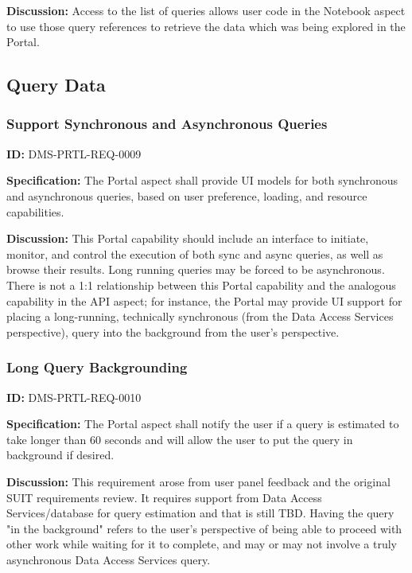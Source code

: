 \documentclass[SE,toc]{lsstdoc}
\begin{document}
\textbf{Discussion:}
Access to the list of queries allows user code in the Notebook aspect to use those query references to retrieve the data which was being explored in the Portal.

\subsection{Query Data}

\subsubsection{Support Synchronous and Asynchronous Queries}

\label{DMS-PRTL-REQ-0009}
\textbf{ID:} DMS-PRTL-REQ-0009

\textbf{Specification:}
The Portal aspect shall provide UI models for both synchronous and asynchronous queries, based on user preference, loading, and resource capabilities.

\textbf{Discussion:}
This Portal capability should include an interface to initiate, monitor, and control the execution of both sync and async queries, as well as browse their results. Long running queries may be forced to be asynchronous.
There is not a 1:1 relationship between this Portal capability and the analogous capability in the API aspect; for instance, the Portal may provide UI support for placing a long-running, technically synchronous (from the Data Access Services perspective), query into the background from the user's perspective.

\subsubsection{Long Query Backgrounding}

\label{DMS-PRTL-REQ-0010}
\textbf{ID:} DMS-PRTL-REQ-0010

\textbf{Specification:}
The Portal aspect shall notify the user if a query is estimated to take longer than 60 seconds and will allow the user to put the query in background if desired.

\textbf{Discussion:}
This requirement arose from user panel feedback and the original SUIT requirements review.  It requires support from Data Access Services/database for query estimation and that is still TBD.  Having the query "in the background" refers to the user's perspective of being able to proceed with other work while waiting for it to complete, and may or may not involve a truly asynchronous Data Access Services query.
\end{document}
